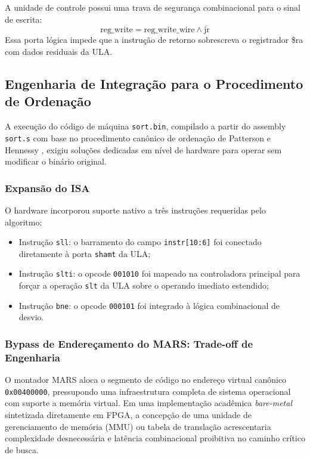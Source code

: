 A unidade de controle possui uma trava de segurança combinacional para o sinal de escrita:
\begin{equation}
    \text{reg\_write} = \text{reg\_write\_wire} \land \overline{\text{jr}}
\end{equation}
Essa porta lógica impede que a instrução de retorno sobrescreva o registrador \$ra com dados residuais da ULA.

\subsection{Engenharia de Integração para o Procedimento de Ordenação}
A execução do código de máquina \texttt{sort.bin}, compilado a partir do assembly \texttt{sort.s} com base no procedimento canônico de ordenação de Patterson e Hennessy \cite{patterson_mips}, exigiu soluções dedicadas em nível de hardware para operar sem modificar o binário original.

\subsubsection{Expansão do ISA}
O hardware incorporou suporte nativo a três instruções requeridas pelo algoritmo:
\begin{itemize}
    \item Instrução \texttt{sll}: o barramento do campo \texttt{instr[10:6]} foi conectado diretamente à porta \texttt{shamt} da ULA;
    \item Instrução \texttt{slti}: o opcode \texttt{001010} foi mapeado na controladora principal para forçar a operação \texttt{slt} da ULA sobre o operando imediato estendido;
    \item Instrução \texttt{bne}: o opcode \texttt{000101} foi integrado à lógica combinacional de desvio.
\end{itemize}

\subsubsection{Bypass de Endereçamento do MARS: Trade-off de Engenharia}
O montador MARS \cite{mars_simulator} aloca o segmento de código no endereço virtual canônico \texttt{0x00400000}, pressupondo uma infraestrutura completa de sistema operacional com suporte a memória virtual. Em uma implementação acadêmica \textit{bare-metal} sintetizada diretamente em FPGA, a concepção de uma unidade de gerenciamento de memória (MMU) ou tabela de translação acrescentaria complexidade desnecessária e latência combinacional proibitiva no caminho crítico de busca.

